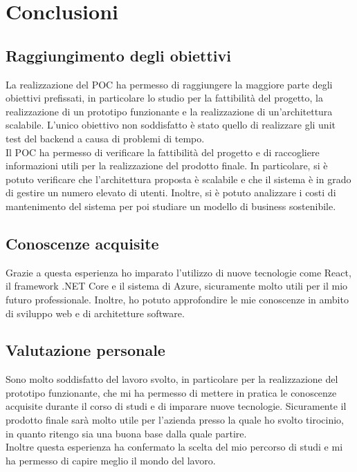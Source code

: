 \chapter{Conclusioni}
\label{cap:conclusioni}

\section{Raggiungimento degli obiettivi}
La realizzazione del POC ha permesso di raggiungere la maggiore parte degli obiettivi prefissati, in particolare lo studio per la fattibilità del progetto, la realizzazione di un prototipo funzionante e la realizzazione di un'architettura scalabile. L'unico obiettivo non soddisfatto è stato quello di realizzare gli unit test del backend a causa di problemi di tempo.\\
Il POC ha permesso di verificare la fattibilità del progetto e di raccogliere informazioni utili per la realizzazione del prodotto finale. In particolare, si è potuto verificare che l'architettura proposta è scalabile e che il sistema è in grado di gestire un numero elevato di utenti. Inoltre, si è potuto analizzare i costi di mantenimento del sistema per poi studiare un modello di business sostenibile.\\

\section{Conoscenze acquisite}
Grazie a questa esperienza ho imparato l'utilizzo di nuove tecnologie come React, il framework .NET Core e il sistema di Azure, sicuramente molto utili per il mio futuro professionale. Inoltre, ho potuto approfondire le mie conoscenze in ambito di sviluppo web e di architetture software.\\
\section{Valutazione personale}
Sono molto soddisfatto del lavoro svolto, in particolare per la realizzazione del prototipo funzionante, che mi ha permesso di mettere in pratica le conoscenze acquisite durante il corso di studi e di imparare nuove tecnologie. Sicuramente il prodotto finale sarà molto utile per l'azienda presso la quale ho svolto tirocinio, in quanto ritengo sia una buona base dalla quale partire.\\ Inoltre questa esperienza ha confermato la scelta del mio percorso di studi e mi ha permesso di capire meglio il mondo del lavoro.\\
